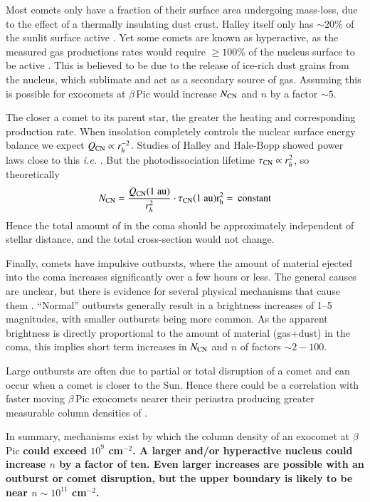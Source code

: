 \documentclass{aa}
\newcommand{\bp}{$\beta$\,Pic}
\begin{document}
Most comets only have a fraction of their surface area undergoing mass-loss, due to the effect of a thermally insulating dust crust.
%
Halley itself only has $\sim20$\% of the sunlit surface active \citep{Keller1987}.
%
Yet some comets are known as hyperactive, as the measured gas productions rates would require $\geq 100$\% of the nucleus surface to be active \citep{Sunshine2021}.
%
This is believed to be due to the release of ice-rich dust grains from the nucleus, which sublimate and act as a secondary source of gas.
%
Assuming this is possible for exocomets at \bp{} would increase $N_{\ce{CN}}$ and $n$ by a factor $\sim 5$.

The closer a comet to its parent star, the greater the heating and corresponding production rate.
%
When insolation completely controls the nuclear surface energy balance we expect
$Q_{\ce{CN}}\propto r_h^{-2}$.
%
Studies of Halley and Hale-Bopp showed power laws close to this {\it i.e.} \cite{Biver2002}.
%
But the photodissociation lifetime $\tau_{\ce{CN}}\propto r_h^{2}$, so theoretically
$$N_{\ce{CN}}=\frac{Q_{\ce{CN}}(1~\rm{au})}{r_h^2}\cdot  \tau_{\ce{CN}} (1~\rm{au}) r_h^2 =\:{\rm constant} $$
Hence the total amount of  in the coma should be approximately independent of stellar distance, and the total cross-section would not change.

Finally, comets have impulsive outbursts, where the amount of material ejected into the coma increases significantly over a few hours or less.
%
The general causes are unclear, but there is evidence for several physical mechanisms that cause them 
\citep{Kelley2021,Muller2024}.
``Normal'' outbursts generally result in a brightness increases of 1--5 magnitudes, with smaller outbursts being more common.
%
As the apparent brightness is directly proportional to the amount of material (gas+dust) in the coma, this implies short term increases in $N_{\ce{CN}}$ and $n$ of factors $\sim 2-100$.

Large outbursts are often due to partial or total disruption of a comet and can occur when a comet is closer to the Sun.
%
Hence there could be a correlation with faster moving \bp{} exocomets nearer their periastra producing greater measurable column densities of .

In summary, mechanisms exist by which the  column density of an exocomet at \bp{} 
{\bf
could exceed $10^{9}$ cm$^{-2}$.
%
A larger and/or hyperactive nucleus could increase $n$ by a factor of ten.
%
Even larger increases are possible with an outburst or comet disruption, but the upper boundary is likely to be near $n\sim10^{11}$ cm$^{-2}$. 
}
\end{document}

